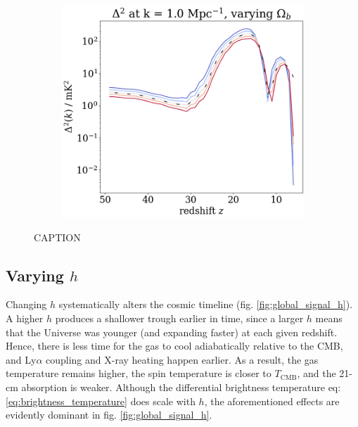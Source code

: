 \documentclass[floats,floatfix,showpacs,amssymb,prd,superscriptaddress,nofootinbib]{revtex4-2} %
\begin{document}
\begin{figure}[H]
\begin{subfigure}[b]{0.45\textwidth}
     \end{subfigure}
     \hfill
     \begin{subfigure}[b]{0.45\textwidth}
         \centering
         \includegraphics[width=\textwidth]{images/simulation_results/power_spectrum_fixed_k_1.0_Ob.png}
         \label{fig:power_spectrum_fixed_k_1.0_Ob}
     \end{subfigure}
        \caption{CAPTION}
        \label{fig:simulation_results_Ob}
\end{figure}

\subsection{Varying $h$}

Changing $h$ systematically alters the cosmic timeline (fig. \ref{fig:global_signal_h}). A higher $h$ produces a shallower trough earlier in time, since a larger $h$ means that the Universe was younger (and expanding faster) at each given redshift. Hence, there is less time for the gas to cool adiabatically relative to the CMB, and Ly$\alpha$ coupling and X-ray heating happen earlier. As a result, the gas temperature remains higher, the spin temperature is closer to $T_{\text{CMB}}$, and the 21-cm absorption is weaker. Although the differential brightness temperature eq: \ref{eq:brightness_temperature} does scale with $h$, the aforementioned effects are evidently dominant in fig. \ref{fig:global_signal_h}. 
\end{document}
